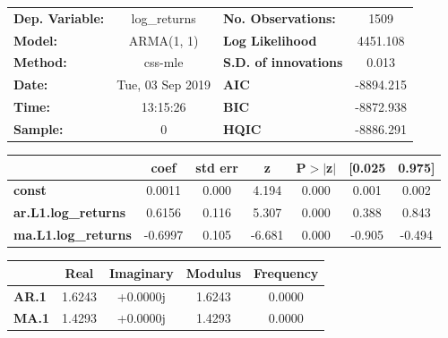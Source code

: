 \begin{center}
\begin{tabular}{lclc}
\toprule
\textbf{Dep. Variable:}     &        log\_returns       & \textbf{  No. Observations:  } &            1509            \\
\textbf{Model:}             &         ARMA(1, 1)        & \textbf{  Log Likelihood     } &          4451.108          \\
\textbf{Method:}            &          css-mle          & \textbf{  S.D. of innovations} &           0.013            \\
\textbf{Date:}              &      Tue, 03 Sep 2019     & \textbf{  AIC                } &         -8894.215          \\
\textbf{Time:}              &          13:15:26         & \textbf{  BIC                } &         -8872.938          \\
\textbf{Sample:}            &             0             & \textbf{  HQIC               } &         -8886.291          \\
\bottomrule
\end{tabular}
\begin{tabular}{lcccccc}
                            & \textbf{coef} & \textbf{std err} & \textbf{z} & \textbf{P$> |$z$|$} & \textbf{[0.025} & \textbf{0.975]}  \\
\midrule
\textbf{const}              &       0.0011  &        0.000     &     4.194  &         0.000        &        0.001    &        0.002     \\
\textbf{ar.L1.log\_returns} &       0.6156  &        0.116     &     5.307  &         0.000        &        0.388    &        0.843     \\
\textbf{ma.L1.log\_returns} &      -0.6997  &        0.105     &    -6.681  &         0.000        &       -0.905    &       -0.494     \\
\bottomrule
\end{tabular}
\begin{tabular}{lcccc}
              & \textbf{            Real} & \textbf{         Imaginary} & \textbf{         Modulus} & \textbf{        Frequency}  \\
\midrule
\textbf{AR.1} &                1.6243     &                +0.0000j     &                1.6243     &                0.0000       \\
\textbf{MA.1} &                1.4293     &                +0.0000j     &                1.4293     &                0.0000       \\
\bottomrule
\end{tabular}
\end{center}
